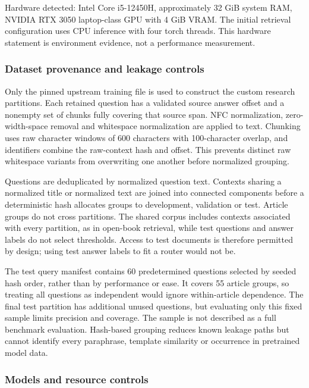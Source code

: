 Hardware detected: Intel Core i5-12450H, approximately 32 GiB system
RAM, NVIDIA RTX 3050 laptop-class GPU with 4 GiB VRAM. The initial
retrieval configuration uses CPU inference with four torch threads. This
hardware statement is environment evidence, not a performance
measurement.

\hypertarget{dataset-provenance-and-leakage-controls}{%
\subsubsection{Dataset provenance and leakage
controls}\label{dataset-provenance-and-leakage-controls}}

Only the pinned upstream training file is used to construct the custom
research partitions. Each retained question has a validated source
answer offset and a nonempty set of chunks fully covering that source
span. NFC normalization, zero-width-space removal and whitespace
normalization are applied to text. Chunking uses raw character windows
of 600 characters with 100-character overlap, and identifiers combine
the raw-context hash and offset. This prevents distinct raw whitespace
variants from overwriting one another before normalized grouping.

Questions are deduplicated by normalized question text. Contexts sharing
a normalized title or normalized text are joined into connected
components before a deterministic hash allocates groups to development,
validation or test. Article groups do not cross partitions. The shared
corpus includes contexts associated with every partition, as in
open-book retrieval, while test questions and answer labels do not
select thresholds. Access to test documents is therefore permitted by
design; using test answer labels to fit a router would not be.

The test query manifest contains 60 predetermined questions selected by
seeded hash order, rather than by performance or ease. It covers 55
article groups, so treating all questions as independent would ignore
within-article dependence. The final test partition has additional
unused questions, but evaluating only this fixed sample limits precision
and coverage. The sample is not described as a full benchmark
evaluation. Hash-based grouping reduces known leakage paths but cannot
identify every paraphrase, template similarity or occurrence in
pretrained model data.

\hypertarget{models-and-resource-controls}{%
\subsubsection{Models and resource
controls}\label{models-and-resource-controls}}

